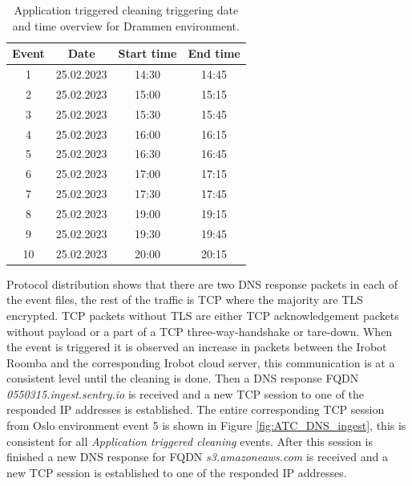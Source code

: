\begin{table}[H]
\centering
\caption{Application triggered cleaning triggering date and time overview for Drammen environment.}
\label{tab:ATC_dateandtimeDrammen}
\begin{tabular}{|c|c|c|c|}
\hline
\textbf{Event} & \textbf{Date} & \textbf{Start time} & \textbf{End time} \\ \hline
1              & 25.02.2023         & 14:30               & 14:45             \\ \hline
2              & 25.02.2023         & 15:00               & 15:15             \\ \hline
3              & 25.02.2023         & 15:30               & 15:45             \\ \hline
4              & 25.02.2023         & 16:00               & 16:15             \\ \hline
5              & 25.02.2023         & 16:30               & 16:45             \\ \hline
6              & 25.02.2023         & 17:00               & 17:15             \\ \hline
7              & 25.02.2023         & 17:30               & 17:45             \\ \hline
8              & 25.02.2023         & 19:00               & 19:15             \\ \hline
9              & 25.02.2023         & 19:30               & 19:45             \\ \hline
10             & 25.02.2023         & 20:00               & 20:15             \\ \hline
\end{tabular}
\end{table}

Protocol distribution shows that there are two \gls{DNS} response packets in each of the event files, the rest of the traffic is \gls{TCP} where the majority are \gls{TLS} encrypted. \gls{TCP} packets without \gls{TLS} are either \gls{TCP} acknowledgement packets without payload or a part of a \gls{TCP} three-way-handshake or tare-down. When the event is triggered it is observed an increase in packets between the Irobot Roomba and the corresponding Irobot cloud server, this communication is at a consistent level until the cleaning is done. Then a \gls{DNS} response \gls{FQDN} \textit{0550315.ingest.sentry.io} is received and a new \gls{TCP} session to one of the responded \gls{IP} addresses is established. The entire corresponding \gls{TCP} session from Oslo environment event 5 is shown in Figure \ref{fig:ATC_DNS_ingest}, this is consistent for all \textit{Application triggered cleaning} events. After this session is finished a new \gls{DNS} response for \gls{FQDN} \textit{s3.amazoneaws.com} is received and a new \gls{TCP} session is established to one of the responded \gls{IP} addresses. 

